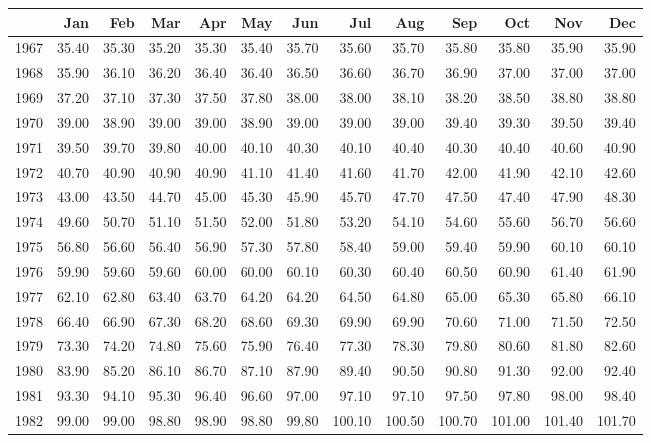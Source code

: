 \begin{longtable}{rrrrrrrrrrrrr}
  \hline
 & Jan & Feb & Mar & Apr & May & Jun & Jul & Aug & Sep & Oct & Nov & Dec \\ 
  \hline
1967 & 35.40 & 35.30 & 35.20 & 35.30 & 35.40 & 35.70 & 35.60 & 35.70 & 35.80 & 35.80 & 35.90 & 35.90 \\ 
  1968 & 35.90 & 36.10 & 36.20 & 36.40 & 36.40 & 36.50 & 36.60 & 36.70 & 36.90 & 37.00 & 37.00 & 37.00 \\ 
  1969 & 37.20 & 37.10 & 37.30 & 37.50 & 37.80 & 38.00 & 38.00 & 38.10 & 38.20 & 38.50 & 38.80 & 38.80 \\ 
  1970 & 39.00 & 38.90 & 39.00 & 39.00 & 38.90 & 39.00 & 39.00 & 39.00 & 39.40 & 39.30 & 39.50 & 39.40 \\ 
  1971 & 39.50 & 39.70 & 39.80 & 40.00 & 40.10 & 40.30 & 40.10 & 40.40 & 40.30 & 40.40 & 40.60 & 40.90 \\ 
  1972 & 40.70 & 40.90 & 40.90 & 40.90 & 41.10 & 41.40 & 41.60 & 41.70 & 42.00 & 41.90 & 42.10 & 42.60 \\ 
  1973 & 43.00 & 43.50 & 44.70 & 45.00 & 45.30 & 45.90 & 45.70 & 47.70 & 47.50 & 47.40 & 47.90 & 48.30 \\ 
  1974 & 49.60 & 50.70 & 51.10 & 51.50 & 52.00 & 51.80 & 53.20 & 54.10 & 54.60 & 55.60 & 56.70 & 56.60 \\ 
  1975 & 56.80 & 56.60 & 56.40 & 56.90 & 57.30 & 57.80 & 58.40 & 59.00 & 59.40 & 59.90 & 60.10 & 60.10 \\ 
  1976 & 59.90 & 59.60 & 59.60 & 60.00 & 60.00 & 60.10 & 60.30 & 60.40 & 60.50 & 60.90 & 61.40 & 61.90 \\ 
  1977 & 62.10 & 62.80 & 63.40 & 63.70 & 64.20 & 64.20 & 64.50 & 64.80 & 65.00 & 65.30 & 65.80 & 66.10 \\ 
  1978 & 66.40 & 66.90 & 67.30 & 68.20 & 68.60 & 69.30 & 69.90 & 69.90 & 70.60 & 71.00 & 71.50 & 72.50 \\ 
  1979 & 73.30 & 74.20 & 74.80 & 75.60 & 75.90 & 76.40 & 77.30 & 78.30 & 79.80 & 80.60 & 81.80 & 82.60 \\ 
  1980 & 83.90 & 85.20 & 86.10 & 86.70 & 87.10 & 87.90 & 89.40 & 90.50 & 90.80 & 91.30 & 92.00 & 92.40 \\ 
  1981 & 93.30 & 94.10 & 95.30 & 96.40 & 96.60 & 97.00 & 97.10 & 97.10 & 97.50 & 97.80 & 98.00 & 98.40 \\ 
  1982 & 99.00 & 99.00 & 98.80 & 98.90 & 98.80 & 99.80 & 100.10 & 100.50 & 100.70 & 101.00 & 101.40 & 101.70 \\ 

\end{longtable}
